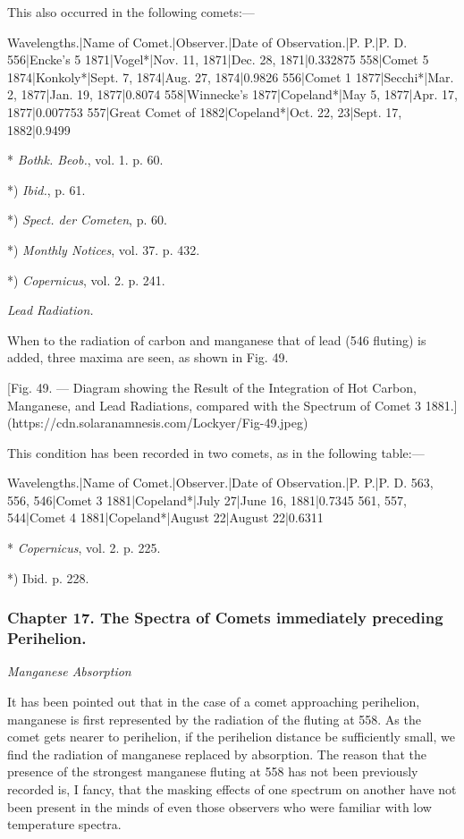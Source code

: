 \documentclass[a4paper, 12pt, oneside, polutonikogreek, english]{article}
\begin{document}
This also occurred in the following comets:---

Wavelengths.|Name of Comet.|Observer.|Date of Observation.|P. P.|P. D. 
556|Encke's 5 1871|Vogel*|Nov. 11, 1871|Dec. 28, 1871|0.332875 
558|Comet 5 1874|Konkoly*|Sept. 7, 1874|Aug. 27, 1874|0.9826 
556|Comet 1 1877|Secchi*|Mar. 2, 1877|Jan. 19, 1877|0.8074 
558|Winnecke's 1877|Copeland*|May 5, 1877|Apr. 17, 1877|0.007753 
557|Great Comet of 1882|Copeland*|Oct. 22, 23|Sept. 17, 1882|0.9499 

* \emph{Bothk. Beob.}, vol. 1. p. 60.

*) \emph{Ibid.}, p. 61.

*) \emph{Spect. der Cometen}, p. 60.

*) \emph{Monthly Notices}, vol. 37. p. 432.

*) \emph{Copernicus}, vol. 2. p. 241.

\emph{Lead Radiation.}

When to the radiation of carbon and manganese that of lead (546 fluting) is added, three maxima are seen, as shown in Fig. 49.

[Fig. 49. --- Diagram showing the Result of the Integration of Hot Carbon, Manganese, and Lead Radiations, compared with the Spectrum of Comet 3 1881.](https://cdn.solaranamnesis.com/Lockyer/Fig-49.jpeg)

This condition has been recorded in two comets, as in the following table:---

Wavelengths.|Name of Comet.|Observer.|Date of Observation.|P. P.|P. D. 
563, 556, 546|Comet 3 1881|Copeland*|July 27|June 16, 1881|0.7345 
561, 557, 544|Comet 4 1881|Copeland*|August 22|August 22|0.6311

* \emph{Copernicus}, vol. 2. p. 225.

*) Ibid. p. 228.

\subsubsection{Chapter 17. The Spectra of Comets immediately preceding Perihelion.}

\emph{Manganese Absorption}

It has been pointed out that in the case of a comet approaching perihelion, manganese is first represented by the radiation of the fluting at 558. As the comet gets nearer to perihelion, if the perihelion distance be sufficiently small, we find the radiation of manganese replaced by absorption. The reason that the presence of the strongest manganese fluting at 558 has not been previously recorded is, I fancy, that the masking effects of one spectrum on another have not been present in the minds of even those observers who were familiar with low temperature spectra.
\end{document}
